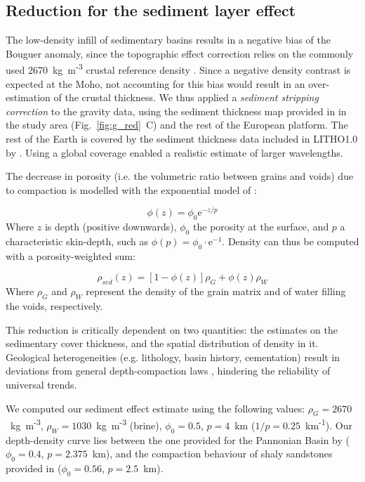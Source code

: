 \subsection{Reduction for the sediment layer effect}
\label{ss:Appl:GravSed}
The low-density infill of sedimentary basins results in a negative bias of the Bouguer anomaly, since the topographic effect correction relies on the commonly used 2670~{kg~m\textsuperscript{-3}} crustal reference density \parencite{Hinze2003}.
Since a negative density contrast is expected at the Moho, not accounting for this bias would result in an over-estimation of the crustal thickness.
We thus applied a \textit{sediment stripping correction} \parencite{Chen2014} to the gravity data, using the sediment thickness map provided in \textcite{Tesauro2008} in the study area (Fig.~\ref{fig:g_red}~C) and the rest of the European platform.
The rest of the Earth is covered by the sediment thickness data included in {LITHO1.0} by \textcite{Pasyanos2014}.
Using a global coverage enabled a realistic estimate of larger wavelengths.

The decrease in porosity (i.e. the volumetric ratio between grains and voids) due to compaction is modelled with the exponential model of \textcite{woodside1961}:

\begin{equation}
	\label{eq:ExpCompactionPhi}
	\phi(z) = \phi_0 \mathrm{e}^{-z/p}
\end{equation}
Where $z$ is depth (positive downwards), $\phi_0$ the porosity at the surface, and $p$ a characteristic skin-depth, such as $\phi(p) = \phi_0 \cdot \mathrm{e}^{-1}$.
Density can thus be computed with a porosity-weighted sum:

\begin{equation}
	\label{eq:ExpCompactionRho}
	\rho_{sed}(z) = [1-\phi(z)] \rho_{G} + \phi(z) \rho_{W}
\end{equation}
Where $\rho_{G}$ and $\rho_{W}$ represent the density of the grain matrix and of water filling the voids, respectively.

This reduction is critically dependent on two quantities: the estimates on the sedimentary cover thickness, and the spatial distribution of density in it.
Geological heterogeneities (e.g. lithology, basin history, cementation) result in deviations from general depth-compaction laws \parencite{allen2013basin}, hindering the reliability of universal trends.

We computed our sediment effect estimate using the following values: $\rho_G = 2670$~{kg~m\textsuperscript{-3}}, $\rho_W = 1030$~{kg~m\textsuperscript{-3}} (brine), $\phi_0 = 0.5$, $p = 4$~{km} ($1/p = 0.25$~km\textsuperscript{-1}).
Our depth-density curve lies between the one provided for the Pannonian Basin by \textcite{Kaban2010} ($\phi_0 = 0.4$, $p = 2.375$~{km}), and the compaction behaviour of shaly sandstones provided in \parencite{allen2013basin} ($\phi_0 = 0.56$, $p = 2.5$~{km}).

